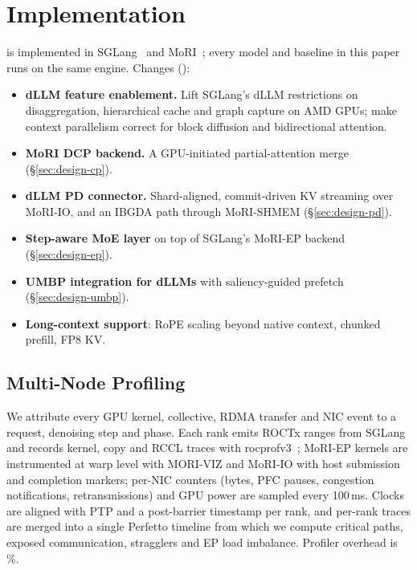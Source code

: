 \section{Implementation}
\label{sec:impl}

\sys is implemented in SGLang~\cite{zheng2023sglang} and MoRI~\cite{mori}; every model and baseline
in this paper runs on the same engine. Changes ():
\begin{itemize}
  \item \textbf{dLLM feature enablement.} Lift SGLang's dLLM restrictions on disaggregation,
  hierarchical cache and graph capture on AMD GPUs; make context parallelism correct for block
  diffusion and bidirectional attention.
  \item \textbf{MoRI DCP backend.} A GPU-initiated partial-attention merge (\S\ref{sec:design-cp}).
  \item \textbf{dLLM PD connector.} Shard-aligned, commit-driven KV streaming over MoRI-IO, and an
  IBGDA path through MoRI-SHMEM (\S\ref{sec:design-pd}).
  \item \textbf{Step-aware MoE layer} on top of SGLang's MoRI-EP backend (\S\ref{sec:design-ep}).
  \item \textbf{UMBP integration for dLLMs} with saliency-guided prefetch (\S\ref{sec:design-umbp}).
  \item \textbf{Long-context support}: RoPE scaling beyond native context, chunked prefill, FP8 KV.
\end{itemize}

\subsection{Multi-Node Profiling}
\label{sec:impl-prof}
We attribute every GPU kernel, collective, RDMA transfer and NIC event to a request, denoising step
and phase. Each rank emits ROCTx ranges from SGLang and records kernel, copy and RCCL traces with
rocprofv3~\cite{rocprofv3}; MoRI-EP kernels are instrumented at warp level with MORI-VIZ and MoRI-IO
with host submission and completion markers; per-NIC counters (bytes, PFC pauses, congestion
notifications, retransmissions) and GPU power are sampled every 100\,ms. Clocks are aligned with PTP
and a post-barrier timestamp per rank, and per-rank traces are merged into a single Perfetto timeline
from which we compute critical paths, exposed communication, stragglers and EP load imbalance.
Profiler overhead is \%.
